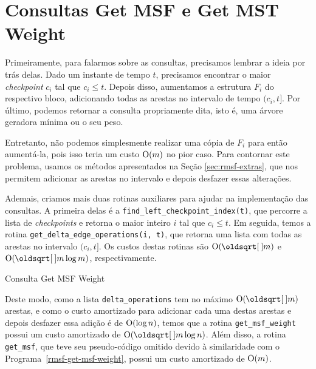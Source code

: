 \section{Consultas Get MSF e Get MST Weight}
\label{sec:rmsf-get-msf}

Primeiramente, para falarmos sobre as consultas, precisamos lembrar a ideia por trás delas. Dado um instante de tempo $t$, precisamos encontrar o maior \emph{checkpoint} $c_i$ tal que $c_i \leq t$. Depois disso, aumentamos a estrutura $F_i$ do respectivo bloco, adicionando todas as arestas no intervalo de tempo $(c_i, t]$. Por último, podemos retornar a consulta propriamente dita, isto é, uma árvore geradora mínima ou o seu peso.

Entretanto, não podemos simplesmente realizar uma cópia de $F_i$ para então aumentá-la, pois isso teria um custo $\mathrm{O}(m)$ no pior caso. Para contornar este problema, usamos os métodos apresentados na Seção \ref{sec:rmsf-extras}, que nos permitem adicionar as arestas no intervalo e depois desfazer essas alterações.

Ademais, criamos mais duas rotinas auxiliares para ajudar na implementação das consultas. A primeira delas é a \texttt{find\_left\_checkpoint\_index(t)}, que percorre a lista de \emph{checkpoints} e retorna o maior inteiro $i$ tal que $c_i \leq t$. Em seguida, temos a rotina \texttt{get\_delta\_edge\_operations(i, t)}, que retorna uma lista com todas as arestas no intervalo $(c_i, t]$. Os custos destas rotinas são $\Oh(\sqrt{m})$ e $\Oh(\sqrt{m}\log{m})$, respectivamente.

\begin{algorithm}[h!]
    \caption{Consulta Get MSF Weight}\label{rmsf-get-msf-weight}
    \begin{algorithmic}[1]
        \State {}
        \EndFunction
    \end{algorithmic}
\end{algorithm}

Deste modo, como a lista \texttt{delta\_operations} tem no máximo $\Oh(\sqrt{m})$ arestas, e como o custo amortizado para adicionar cada uma destas arestas e depois desfazer essa adição é de $\mathrm{O}(\log{n})$, temos que a rotina \texttt{get\_msf\_weight} possui um custo amortizado de $\Oh(\sqrt{m} \log{n})$. Além disso, a rotina \texttt{get\_msf}, que teve seu pseudo-código omitido devido à similaridade com o Programa~\ref{rmsf-get-msf-weight}, possui um custo amortizado de $\mathrm{O}(m)$.

